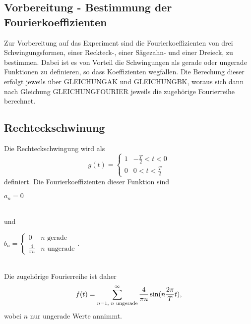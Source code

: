 \subsection{Vorbereitung - Bestimmung der Fourierkoeffizienten}
\label{sec:vorbereitung}
Zur Vorbereitung auf das Experiment sind die Fourierkoeffizienten von drei Schwingungsformen, einer Reckteck-, einer Sägezahn-
und einer Dreieck, zu bestimmen. Dabei ist es von Vorteil die Schwingungen als gerade oder ungerade Funktionen zu definieren, so 
dass Koeffizienten wegfallen. Die Berechung dieser erfolgt jeweils über GLEICHUNGAK und GLEICHUNGBK, woraus sich dann nach Gleichung
GLEICHUNGFOURIER jeweils die zugehörige Fourierreihe berechnet.
    \subsection{Rechteckschwinung}
    Die Rechteckschwingung wird als
    \begin{equation}
    \label{eqn:rechteck}
    g(t) = \begin{cases}
                1 & -\frac{T}{2} < t < 0 \\
                0 & 0 < t < \frac{T}{2} 
            \end{cases}
    \end{equation}        
    definiert. Die Fourierkoeffizienten dieser Funktion sind
    \\
    \centerline{$a_n = 0$} 
    \\
    und
    \\ 
    \centerline{$b_n = \begin{cases}
                            0 & n \text{ gerade} \\
                            \frac{4}{\pi n } & n \text{ ungerade}
                        \end{cases}$.}
                        \\
    Die zugehörige Fourierreihe ist daher
    \begin{equation}
    \label{eqn:fourierrechteck}
    f(t) = \sum_{n=1 \\ \\ \text{, $n$ ungerade}}^{\infty}  \frac{4}{\pi n } \sin(n \frac{2 \pi}{T} t),
    \end{equation}
    wobei $n$ nur ungerade Werte annimmt.

